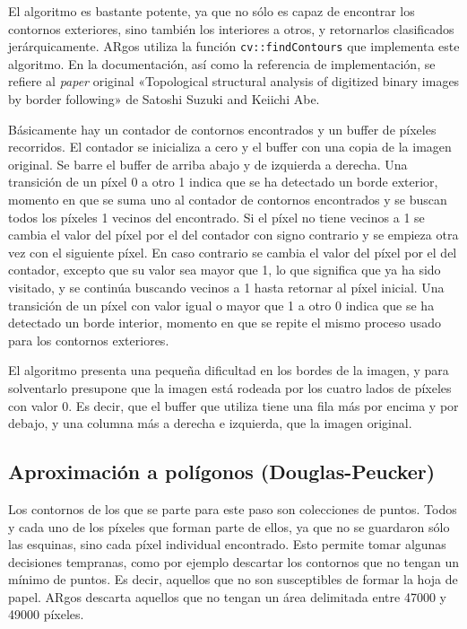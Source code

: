 El algoritmo es bastante potente, ya que no sólo es capaz de encontrar los contornos exteriores,
sino también los interiores a otros, y retornarlos clasificados jerárquicamente. ARgos utiliza la
función \texttt{cv::findContours} que implementa este algoritmo. En la documentación, así como la
referencia de implementación, se refiere al \textit{paper} original «Topological structural analysis
of digitized binary images by border following» de Satoshi Suzuki and Keiichi Abe.

Básicamente hay un contador de contornos encontrados y un buffer de píxeles recorridos. El contador
se inicializa a cero y el buffer con una copia de la imagen original. Se barre el buffer de arriba
abajo y de izquierda a derecha. Una transición de un píxel 0 a otro 1 indica que se ha detectado un
borde exterior, momento en que se suma uno al contador de contornos encontrados y se buscan todos
los píxeles 1 vecinos del encontrado. Si el píxel no tiene vecinos a 1 se cambia el valor del píxel
por el del contador con signo contrario y se empieza otra vez con el siguiente píxel. En caso
contrario se cambia el valor del píxel por el del contador, excepto que su valor sea mayor que 1, lo
que significa que ya ha sido visitado, y se continúa buscando vecinos a 1 hasta retornar al píxel
inicial. Una transición de un píxel con valor igual o mayor que 1 a otro 0 indica que se ha
detectado un borde interior, momento en que se repite el mismo proceso usado para los contornos
exteriores.

El algoritmo presenta una pequeña dificultad en los bordes de la imagen, y para solventarlo
presupone que la imagen está rodeada por los cuatro lados de píxeles con valor 0. Es decir, que el
buffer que utiliza tiene una fila más por encima y por debajo, y una columna más a derecha e
izquierda, que la imagen original.


\subsection{Aproximación a polígonos (Douglas-Peucker)}
Los contornos de los que se parte para este paso son colecciones de puntos. Todos y cada uno de los
píxeles que forman parte de ellos, ya que no se guardaron sólo las esquinas, sino cada píxel
individual encontrado. Esto permite tomar algunas decisiones tempranas, como por ejemplo descartar
los contornos que no tengan un mínimo de puntos. Es decir, aquellos que no son susceptibles de formar
la hoja de papel. ARgos descarta aquellos que no tengan un área delimitada entre 47000 y 49000
píxeles.

